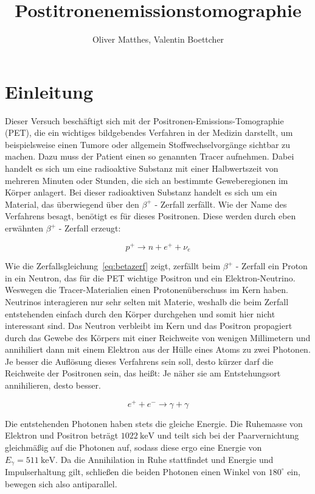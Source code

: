 \documentclass[slug=PET, room=Andreas-Schubert-Bau\,\ 424A, supervisor=Carsten\ Bittrich, coursedate=10.\ 01.\ 2020]{../../Lab_Report_LaTeX/lab_report}
\title{Postitronenemissionstomographie}
\author{Oliver Matthes, Valentin Boettcher}
\begin{document}
\maketitle

\section{Einleitung}
\label{sec:einl}

Dieser Versuch beschäftigt sich mit der Positronen-Emissions-Tomographie (PET), die ein
wichtiges bildgebendes Verfahren in der Medizin darstellt, um beispielsweise einen Tumore oder
allgemein Stoffwechselvorgänge sichtbar zu machen.
Dazu muss der Patient einen so genannten Tracer aufnehmen. Dabei handelt es sich um eine
radioaktive Substanz mit einer Halbwertszeit von mehreren Minuten oder Stunden, die sich an
bestimmte Geweberegionen im Körper anlagert. Bei dieser radioaktiven Substanz handelt es sich
um ein Material, das überwiegend über den \(\beta^+\) - Zerfall zerfällt.
Wie der Name des Verfahrens besagt, benötigt es für dieses Positronen. Diese werden durch eben
erwähnten \(\beta^+\) - Zerfall erzeugt:

\begin{equation}\label{eq:betazerf}
        p^+ \rightarrow n + e^+ + \nu_e
\end{equation}

Wie die Zerfallsgleichung~\eqref{eq:betazerf} zeigt, zerfällt beim \(\beta^+\) - Zerfall ein Proton
in ein Neutron, das für die PET wichtige Positron und ein Elektron-Neutrino. Weswegen die
Tracer-Materialien einen Protonenüberschuss im Kern haben.
Neutrinos interagieren nur sehr selten mit Materie, weshalb die beim Zerfall entstehenden einfach
durch den Körper durchgehen und somit hier nicht interessant sind. Das Neutron verbleibt im Kern
und das Positron propagiert durch das Gewebe des Körpers mit einer Reichweite von wenigen
Millimetern und annihiliert dann mit einem Elektron aus der Hülle eines Atoms zu zwei Photonen.
Je besser die Auflösung dieses Verfahrens sein soll, desto kürzer darf die Reichweite der
Positronen sein, das heißt: Je näher sie am Entstehungsort annihilieren, desto besser.

\begin{equation}\label{eq:annihi}
        e^+ + e^- \rightarrow \gamma + \gamma
\end{equation}

Die entstehenden Photonen haben stets die gleiche Energie. Die Ruhemasse von Elektron und Positron
beträgt \(\SI{1022}{\kilo\electronvolt}\) und teilt sich bei der Paarvernichtung gleichmäßig auf
die Photonen auf, sodass diese ergo eine Energie von \(E_\gamma = \SI{511}{\kilo\electronvolt}\).
Da die Annihilation in Ruhe stattfindet und Energie und Impulserhaltung gilt, schließen die beiden
Photonen einen Winkel von \(180^\circ\) ein, bewegen sich also antiparallel.\\
\end{document}
